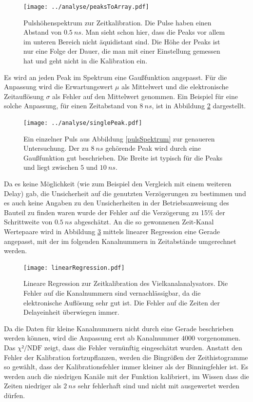 \documentclass[a4paper,12pt]{article}
\begin{document}
\begin{figure}[h]
	\texttt{[image: ../analyse/peaksToArray.pdf]}
	\caption{Pulshöhenspektrum zur Zeitkalibration. Die Pulse haben einen Abstand von
		$\SI{0.5}{ns}$. Man sieht schon hier, dass die Peaks vor allem im unteren Bereich nicht
	äquidistant sind. Die Höhe der Peaks ist nur eine Folge der Dauer, die man mit einer Einstellung
gemessen hat und geht nicht in die Kalibration ein.}
	\label{fig:pulsSpektrum}
\end{figure}


Es wird an jeden Peak  im Spektrum eine Gaußfunktion angepasst.
Für die Anpassung wird die Erwartungswert $μ$ als Mittelwert und die elektronische Zeitauflösung $σ$
als Fehler auf den Mittelwert genommen.
Ein Beispiel für eine solche Anpassung, für einen Zeitabstand von $\SI{8}{ns}$, ist in Abbildung \ref{fig:singlePuls} dargestellt.

\begin{figure}[h]
	\texttt{[image: ../analyse/singlePeak.pdf]}
	\caption{Ein einzelner Puls aus Abbildung \ref{pulsSpektrum} zur genaueren Untersuchung. Der zu
	$\SI{8}{ns}$ gehörende Peak wird durch eine Gaußfunktion gut beschrieben. Die Breite ist typisch
	für die Peaks und liegt zwischen $5$ und $\SI{10}{ns}$.}
	\label{fig:singlePuls}
\end{figure}

Da es keine Möglichkeit (wie zum Beispiel den Vergleich mit einem weiteren Delay) gab, die Unsicherheit auf die genutzten Verzögerungen zu bestimmen und es auch keine Angaben zu
 den Unsicherheiten in der Betriebsanweisung des Bauteil zu finden waren wurde der Fehler auf die
 Verzögerung zu 15\% der Schrittweite von $\SI{0.5}{ns}$ abgeschätzt.
 An die so gewonnenen Zeit-Kanal Wertepaare wird in Abbildung \ref{fig:kalibrationsRegression} mittels linearer Regression eine Gerade angepasst, mit der im folgenden
Kanalnummern in Zeitabstände umgerechnet werden.

\begin{figure}
	\texttt{[image: linearRegression.pdf]}
	\caption{Lineare Regression zur Zeitkalibration des Vielkanalanalysators. Die Fehler auf die
	Kanalnummern sind vernachlässigbar, da die elektronische Auflösung sehr gut ist. Die Fehler auf
die Zeiten der Delayeinheit überwiegen immer.}
	\label{fig:kalibrationsRegression}
\end{figure}

Da die Daten für kleine Kanalnummern nicht durch eine Gerade beschrieben werden können, wird die
Anpassung erst ab Kanalnummer $4000$ vorgenommen.
Das $χ²/\text{NDF}$ zeigt, dass die Fehler vernünftig eingeschätzt wurden.
Anstatt den Fehler der Kalibration fortzupflanzen, werden die Bingrößen der Zeithistogramme so
gewählt, dass der Kalibrationsfehler immer kleiner als der Binningfehler ist.
Es werden auch die niedrigen Kanäle mit der Funktion kalibriert, im Wissen dass die Zeiten niedriger
als $\SI{2}{ns}$ sehr fehlerhaft sind und nicht mit ausgewertet werden dürfen.
\end{document}
